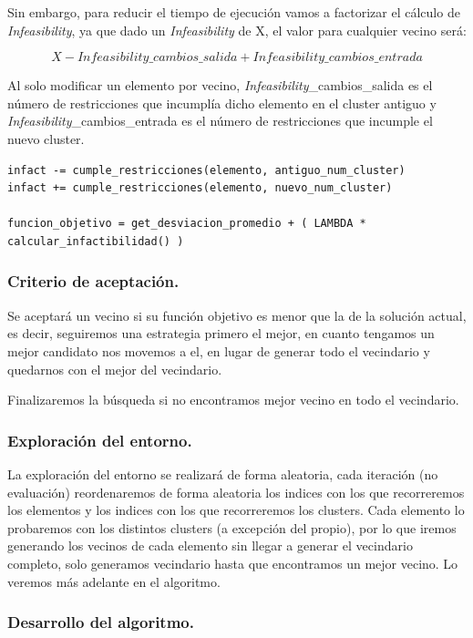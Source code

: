\documentclass[12pt, spanish]{article}
\begin{document}
Sin embargo, para reducir el tiempo de ejecución vamos a factorizar el cálculo de \textit{Infeasibility}, ya que dado un \textit{Infeasibility} de X, el valor para cualquier vecino será:

$$X - \textit{Infeasibility}\_cambios\_salida + \textit{Infeasibility}\_cambios\_entrada$$
 
 Al solo modificar un elemento por vecino, \textit{Infeasibility}\_cambios\_salida  es el número de restricciones que incumplía dicho elemento en el cluster antiguo y \textit{Infeasibility}\_cambios\_entrada es el número de restricciones que incumple el nuevo cluster.
 
 
 
\begin{lstlisting}
infact -= cumple_restricciones(elemento, antiguo_num_cluster)
infact += cumple_restricciones(elemento, nuevo_num_cluster)

funcion_objetivo = get_desviacion_promedio + ( LAMBDA * calcular_infactibilidad() )
 \end{lstlisting}

\subsubsection{Criterio de aceptación.}

Se aceptará un vecino si su función objetivo es menor que la de la solución actual, es decir, seguiremos una estrategia primero el mejor, en cuanto tengamos un mejor candidato nos movemos a el, en lugar de generar todo el vecindario y quedarnos con el mejor del vecindario.

Finalizaremos la búsqueda si no encontramos mejor vecino en todo el vecindario.

\subsubsection{Exploración del entorno.}

La exploración del entorno se realizará de forma aleatoria, cada iteración (no evaluación) reordenaremos de forma aleatoria los indices con los que recorreremos los elementos y los indices con los que recorreremos los clusters. Cada elemento lo probaremos con los distintos clusters (a excepción del propio), por lo que iremos generando los vecinos de cada elemento sin llegar a generar el vecindario completo, solo generamos vecindario hasta que encontramos un mejor vecino. Lo veremos más adelante en el algoritmo.

\subsubsection{Desarrollo del algoritmo.}
\end{document}
